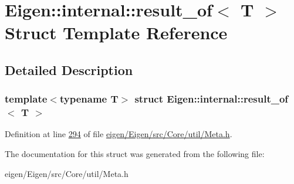 \hypertarget{struct_eigen_1_1internal_1_1result__of}{}\section{Eigen\+:\+:internal\+:\+:result\+\_\+of$<$ T $>$ Struct Template Reference}
\label{struct_eigen_1_1internal_1_1result__of}


\subsection{Detailed Description}
\subsubsection*{template$<$typename T$>$\newline
struct Eigen\+::internal\+::result\+\_\+of$<$ T $>$}



Definition at line \hyperlink{eigen_2_eigen_2src_2_core_2util_2_meta_8h_source_l00294}{294} of file \hyperlink{eigen_2_eigen_2src_2_core_2util_2_meta_8h_source}{eigen/\+Eigen/src/\+Core/util/\+Meta.\+h}.



The documentation for this struct was generated from the following file\+:\begin{DoxyCompactItemize}
\item 
eigen/\+Eigen/src/\+Core/util/\+Meta.\+h\end{DoxyCompactItemize}
